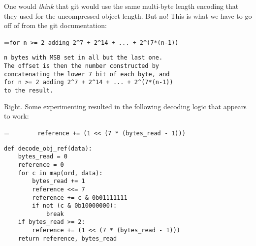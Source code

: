\documentclass{article}
\begin{document}
One would
\emph{think} that git would use the same multi-byte length encoding that they
used for the uncompressed object length.  But no! This is what we have
to go off of from the git documentation:
\begin{center}
\begingroup
{}=\hbox{\footnotesize\verb|for n >= 2 adding 2^7 + 2^14 + ... + 2^(7*(n-1))|}
\begin{minipage}{\wd9}
\footnotesize\begin{verbatim}
n bytes with MSB set in all but the last one.
The offset is then the number constructed by
concatenating the lower 7 bit of each byte, and
for n >= 2 adding 2^7 + 2^14 + ... + 2^(7*(n-1))
to the result.
\end{verbatim}
\end{minipage}
\endgroup
\end{center}
Right. Some experimenting resulted in the following decoding logic
that appears to work:
\begin{center}
\begingroup
{}=\hbox{\footnotesize\verb|        reference += (1 << (7 * (bytes_read - 1)))|}
\begin{minipage}{\wd9}
\footnotesize
{\color{blue}\verb|def|}\verb| decode_obj_ref|{\color{gray}\verb|(|}\verb|data|{\color{gray}\verb|):|}\\
\verb|    bytes_read = 0|\\
\verb|    reference = 0|\\
\verb|    |{\color{blue}\verb|for|}\verb| c |{\color{blue}\verb|in map|}{\color{gray}\verb|(|}\verb|ord, data|{\color{gray}\verb|):|}\\
\verb|        bytes_read += 1|\\
\verb|        reference <<= 7|\\
\verb|        reference += c & 0b01111111|\\
\verb|        |{\color{blue}\verb|if not|}\verb| |{\color{gray}\verb|(|}\verb|c & 0b10000000|{\color{gray}\verb|):|}\\
{\color{blue}\verb|            break|}\\
{\color{blue}\verb|    if|}\verb| bytes_read >= 2|{\color{gray}\verb|:|}\\
\verb|        reference += |{\color{gray}\verb|(|}\verb|1 << |{\color{gray}\verb|(|}\verb|7 * |{\color{gray}\verb|(|}\verb|bytes_read - 1|{\color{gray}\verb|)))|}\\
\verb|    return reference, bytes_read|\\
\end{minipage}
\endgroup
\end{center}
\end{document}
